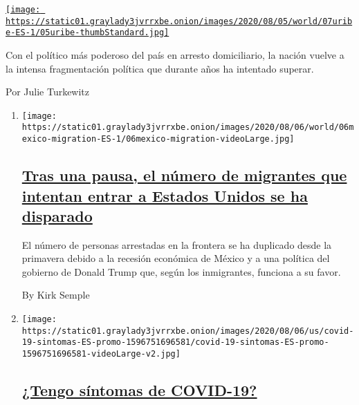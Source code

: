 \begin{enumerate}
\begin{enumerate}
    \href{/es/2020/08/07/espanol/america-latina/alvaro-uribe-colombia.html}{\texttt{[image: https://static01.graylady3jvrrxbe.onion/images/2020/08/05/world/07uribe-ES-1/05uribe-thumbStandard.jpg]}}

    Con el político más poderoso del país en arresto domiciliario, la
    nación vuelve a la intensa fragmentación política que durante años
    ha intentado superar.

    Por Julie Turkewitz
  \end{enumerate}
\end{enumerate}

\begin{enumerate}
\def\labelenumi{\arabic{enumi}.}
\item
  \texttt{[image: https://static01.graylady3jvrrxbe.onion/images/2020/08/06/world/06mexico-migration-ES-1/06mexico-migration-videoLarge.jpg]}

  \hypertarget{tras-una-pausa-el-nuxfamero-de-migrantes-que-intentan-entrar-a-estados-unidos-se-ha-disparado}{%
  \subsection{\texorpdfstring{\href{/es/2020/08/06/espanol/america-latina/migracion-estados-unidos.html}{Tras
  una pausa, el número de migrantes que intentan entrar a Estados Unidos
  se ha
  disparado}}{Tras una pausa, el número de migrantes que intentan entrar a Estados Unidos se ha disparado}}\label{tras-una-pausa-el-nuxfamero-de-migrantes-que-intentan-entrar-a-estados-unidos-se-ha-disparado}}

  El número de personas arrestadas en la frontera se ha duplicado desde
  la primavera debido a la recesión económica de México y a una política
  del gobierno de Donald Trump que, según los inmigrantes, funciona a su
  favor.

  By Kirk Semple
\item
  \texttt{[image: https://static01.graylady3jvrrxbe.onion/images/2020/08/06/us/covid-19-sintomas-ES-promo-1596751696581/covid-19-sintomas-ES-promo-1596751696581-videoLarge-v2.jpg]}

  \hypertarget{tengo-suxedntomas-de-covid-19}{%
  \subsection{\texorpdfstring{\href{/es/interactive/2020/08/06/espanol/ciencia-y-tecnologia/tengo-covid-19-sintomas.html}{¿Tengo
  síntomas de
  COVID-19?}}{¿Tengo síntomas de COVID-19?}}\label{tengo-suxedntomas-de-covid-19}}


\end{enumerate}
